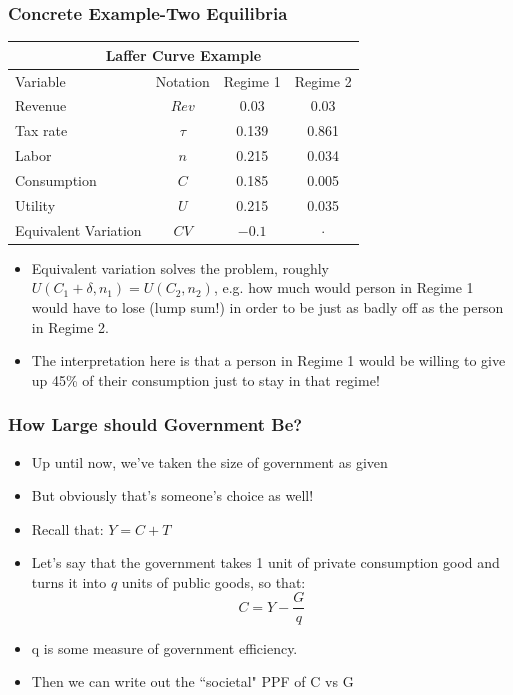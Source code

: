 \documentclass{beamer}
\begin{document}
\begin{frame}
\frametitle[alignment=center]{Concrete Example-Two Equilibria}
\begin{table}
\begin{tabular}{lccc}
\multicolumn{4}{c}{Laffer Curve Example}\\
\hline\hline
Variable & Notation & Regime 1 & Regime 2 \\
\hline
Revenue & $Rev$ & 0.03 & 0.03 \\
Tax rate & $\tau$ & 0.139 & 0.861 \\
Labor & $n$ & 0.215 & 0.034 \\
Consumption & $C$ & 0.185 & 0.005 \\
Utility & $U$ & 0.215 & 0.035 \\
Equivalent Variation & $CV$ & $-0.1$ & $\cdot$
\end{tabular}
\end{table}
\begin{itemize}
\item Equivalent variation solves the problem, roughly $U(C_1+\delta,n_1)=U(C_2,n_2)$, e.g. how much would person in Regime 1 would have to lose (lump sum!) in order to be just as badly off as the person in Regime 2.  
\bigskip
\item The interpretation here is that a person in Regime 1 would be willing to give up 45\% of their consumption just to stay in that regime!
\end{itemize}
\end{frame}



\begin{frame}
\frametitle[alignment=center]{How Large should Government Be?}
\begin{itemize}
\item Up until now, we've taken the size of government as given
\bigskip
\item But obviously that's someone's choice as well!
\bigskip
\item Recall that: $Y=C+T$
\bigskip
\item Let's say that the government takes 1 unit of private consumption good and turns it into $q$ units of public goods, so that:
$$C=Y-\frac{G}{q}$$
\item q is some measure of government efficiency. 
\bigskip
\item Then we can write out the ``societal" PPF of C vs G
\end{itemize}
\end{frame}
\end{document}
